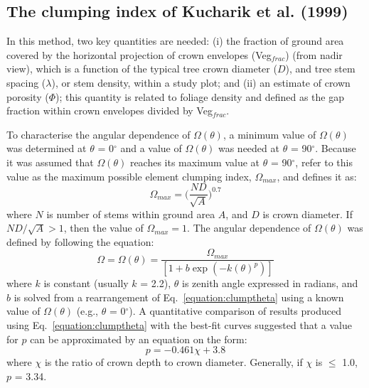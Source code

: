 \subsection{The clumping index of Kucharik et al. (1999)}

In this method, two key quantities are needed: (i) the fraction of ground area covered by the horizontal projection of crown envelopes (Veg$_{frac}$) (from nadir view), which is a function of the typical tree crown diameter ($D$), and tree stem spacing ($\lambda$), or stem density, within a study plot; and (ii) an estimate of crown porosity ($\Phi$); this quantity is related to foliage density and defined as the gap fraction within crown envelopes divided by Veg$_{frac}$.

To characterise the angular dependence of $\Omega(\theta)$, a minimum value of $\Omega(\theta)$ was determined at $\theta$ = 0$^{\circ}$ and a value of $\Omega(\theta)$ was needed at $\theta$ = 90$^{\circ}$. Because it was assumed that $\Omega(\theta)$ reaches its maximum value at $\theta$ = 90$^{\circ}$, \citet{Kucharik1999} refer to this value as the maximum possible element clumping index, $\Omega_{max}$, and defines it as:
\begin{equation}
\Omega_{max} = \Big(\frac{ND}{\sqrt{A}}\Big)^{0.7}
\label{equation:clumpmax}
\end{equation}
\noindent where $N$ is number of stems within ground area $A$, and $D$ is crown diameter. If $ND/\sqrt{A} > 1$, then the value of $\Omega_{max} = 1$. The angular dependence of $\Omega(\theta)$ was defined by \citet{Kucharik1999} following the equation: 
\begin{equation}
\Omega = \Omega(\theta) = \frac{\Omega_{max}}{[1 + b\exp(-k(\theta)^p)]}
\label{equation:clumptheta}
\end{equation}
\noindent where $k$ is constant (usually $k$ = 2.2), $\theta$ is zenith angle expressed in radians, and $b$ is solved from a rearrangement of Eq.~\ref{equation:clumptheta} using a known value of $\Omega(\theta)$ (e.g., $\theta$ = 0$^{\circ}$). A quantitative comparison of results produced using Eq.~\ref{equation:clumptheta} with the best-fit curves suggested that a value for $p$ can be approximated by an equation on the form:
\begin{equation}
p = -0.461\chi + 3.8
\label{equation:pchi}
\end{equation}
\noindent where $\chi$ is the ratio of crown depth to crown diameter. Generally, if $\chi$ is $\leq$ 1.0, $p$ = 3.34. 

